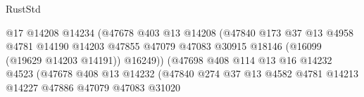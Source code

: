 \begin{lexlean}{RustStd}
\begin{coremodule}
                                                @17
                                                @14208
                                                @14234
                                                (@47678
                                                  @403
                                                  @13
                                                  @14208
                                                  (@47840
                                                    @173
                                                    @37
                                                    @13
                                                    @4958
                                                    @4781
                                                    @14190
                                                    @14203
                                                    @47855
                                                    @47079
                                                    @47083
                                                    @30915
                                                    @18146
                                                    (@16099 (@19629 @14203 @14191))
                                                    @16249))
                                                (@47698
                                                  @408
                                                  @114
                                                  @13
                                                  @16
                                                  @14232
                                                  @4523
                                                  (@47678
                                                    @408
                                                    @13
                                                    @14232
                                                    (@47840
                                                      @274
                                                      @37
                                                      @13
                                                      @4582
                                                      @4781
                                                      @14213
                                                      @14227
                                                      @47886
                                                      @47079
                                                      @47083
                                                      @31020

\end{coremodule}
\end{lexlean}
